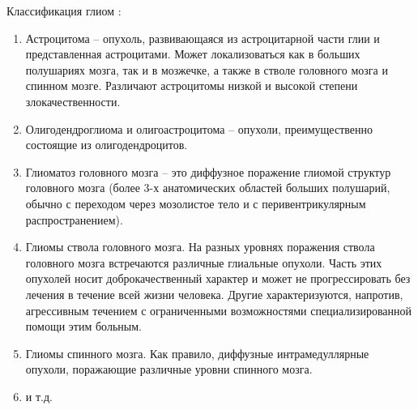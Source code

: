 Классификация глиом \cite{MedicTherms}:
\begin{enumerate}
    \item Астроцитома – опухоль, развивающаяся из астроцитарной части глии и
    представленная астроцитами. Может локализоваться как в больших полушариях мозга, так
    и в мозжечке, а также в стволе головного мозга и спинном мозге. Различают астроцитомы
    низкой и высокой степени злокачественности.
    \item Олигодендроглиома и олигоастроцитома – опухоли, преимущественно состоящие
    из олигодендроцитов.
    \item Глиоматоз головного мозга – это диффузное поражение глиомой структур головного
    мозга (более 3-х анатомических областей больших полушарий, обычно с переходом через
    мозолистое тело и с перивентрикулярным распространением). 
    \item Глиомы ствола головного мозга. На разных уровнях поражения ствола головного мозга
    встречаются различные глиальные опухоли. Часть этих опухолей носит доброкачественный характер и может не
    прогрессировать без лечения в течение всей жизни человека. Другие характеризуются, напротив, агрессивным течением с
    ограниченными возможностями специализированной помощи этим больным. 
   \item Глиомы спинного мозга. Как правило, диффузные интрамедуллярные опухоли,
    поражающие различные уровни спинного мозга. 
    \item и т.д.
\end{enumerate} 




